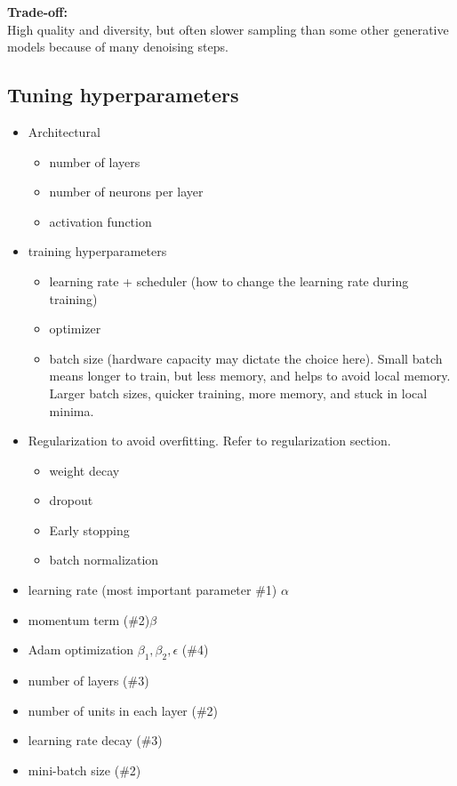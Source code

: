 \documentclass[12pt]{report}
\begin{document}
\textbf{Trade-off:} \\
High quality and diversity, but often slower sampling than some other generative models because of many denoising steps.

\subsection{Tuning hyperparameters}

\begin{itemize}
	\item Architectural
	\begin{itemize}
		\item number of layers
		\item number of neurons per layer
		\item activation function
	\end{itemize}
	\item training hyperparameters
	\begin{itemize}
		\item learning rate + scheduler (how to change the learning rate during training)
		\item optimizer
		\item batch size (hardware capacity may dictate the choice here). Small batch means longer to train, but less memory, and helps to avoid local memory. Larger batch sizes, quicker training, more memory, and stuck in local minima.
	\end{itemize}
	\item Regularization to avoid overfitting. Refer to regularization section. 
	\begin{itemize}
		\item weight decay
		\item dropout
		\item Early stopping
		\item batch normalization
	\end{itemize}
\end{itemize}


\begin{itemize}
  \item learning rate (most important parameter \#1) $\alpha$
  \item momentum term  (\#2)$\beta$
  \item Adam optimization $\beta_1, \beta_2, \epsilon$ (\#4)
  \item number of layers (\#3)
  \item number of units in each layer (\#2)
  \item learning rate decay (\#3)
  \item mini-batch size (\#2)
\end{itemize}
\end{document}
